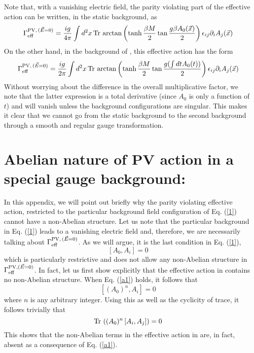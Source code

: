 \documentclass[a4paper,12pt]{article}
\begin{document}
Note that, with a vanishing electric field, the parity violating part
of the effective action can be written, in the static background, as
\begin{equation}
\Gamma_{\rm eff}^{{\rm PV,}\,(\vec{E}=0)} = {ig\over 4\pi} \int
d^{2}x\, {\rm Tr}\,\arctan\left(\tanh {\beta M\over 2}\tan {g\beta
A_{0}(\vec{x})\over 2}\right)\epsilon_{ij}\partial_{i}A_{j}(\vec{x})
\end{equation}
On the other hand, in the background of \cite{fosco:1997vu}, this
effective action has the form
\begin{equation}
\Gamma_{\rm eff}^{{\rm PV,}\,(\vec{E}=0)} = {ig\over 2\pi} \int
d^{2}x\, {\rm Tr}\,\arctan\left(\tanh {\beta M\over 2}\tan {g(\int dt
A_{0}(t))\over 2}\right)\epsilon_{ij}\partial_{i}A_{j}(\vec{x})
\end{equation}
Without worrying about the difference in the overall multiplicative
factor, we note that the latter expression is a total derivative (since
$A_{0}$ is only a function of $t$) and will vanish
unless the background configurations are singular. This makes it clear
that we cannot go from the static background to the second background
through a smooth and regular gauge transformation.

\section{Abelian nature of PV action in a special gauge background:}
In this appendix, we will point out briefly why the parity violating
effective action, restricted to the particular background field
configuration of Eq. (\ref{1}) cannot have a non-Abelian
structure. Let us note that the particular background in Eq. (\ref{1})
leads to a vanishing electric field and, therefore, we are necessarily
talking about $\Gamma_{\rm eff}^{{\rm PV},\,(\vec{E}=0)}$. As we will
argue, it is the last condition in Eq. (\ref{1}),
\begin{equation}
\left[A_{0}, A_{i}\right] = 0\label{a1}
\end{equation}
which is particularly restrictive and does not allow any non-Abelian
structure in $\Gamma_{\rm eff}^{{\rm PV},(\vec{E}=0)}$. In fact, let
us first show explicitly that the effective action in \cite{fosco:1997vu}
contains no non-Abelian structure. When Eq. (\ref{a1}) holds, it follows that
\begin{equation}
\left[(A_{0})^{n}, A_{i}\right] = 0\label{a'}
\end{equation}
where $n$ is any arbitrary integer. Using this as well as the
cyclicity of trace, it follows trivially that
\begin{equation}
{\rm Tr}\,\left((A_{0})^{n}\left[A_{i},A_{j}\right]\right) = 0
\end{equation}
This shows that the non-Abelian terms in the effective action in
\cite{fosco:1997vu} are, in fact, absent as a consequence of Eq. (\ref{a1}).
\end{document}

